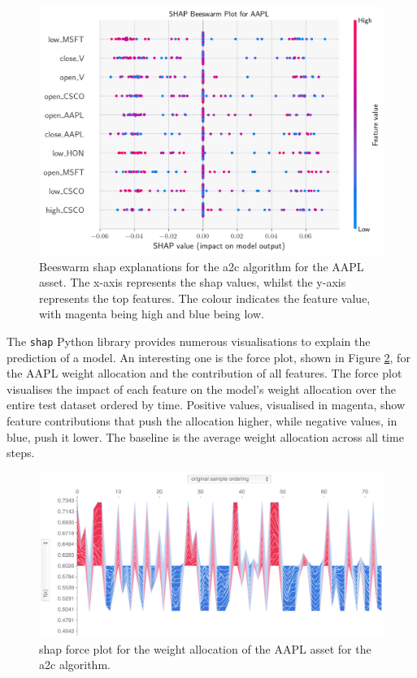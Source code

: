 \begin{figure}
    \centering
    \includegraphics[width=\textwidth]{figures/a2c_shap_beeswarm_aapl.png}
    \caption{Beeswarm \acrshort{shap} explanations for the \acrshort{a2c} algorithm for the AAPL asset. The x-axis represents the \acrshort{shap} values, whilst the y-axis represents the top features. The colour indicates the feature value, with magenta being high and blue being low.}
    \label{fig:a2c_shap_beeswarm_aapl}
\end{figure}

The \texttt{shap} Python library provides numerous visualisations to explain the prediction of a model. An interesting one is the force plot, shown in Figure \ref{fig:a2c_shap_forceplot_aapl}, for the AAPL weight allocation and the contribution of all features. The force plot visualises the impact of each feature on the model's weight allocation over the entire test dataset ordered by time. Positive values, visualised in magenta, show feature contributions that push the allocation higher, while negative values, in blue, push it lower. The baseline is the average weight allocation across all time steps. 

\begin{figure}
    \centering
    \includegraphics[width=\textwidth]{figures/a2c_shap_forceplot_aapl.png}
    \caption{\acrshort{shap} force plot for the weight allocation of the AAPL asset for the \acrshort{a2c} algorithm.}
    \label{fig:a2c_shap_forceplot_aapl}
\end{figure}

